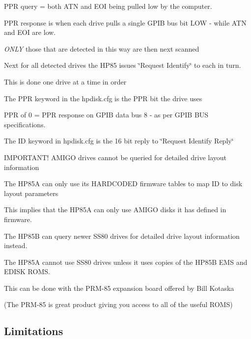 \begin{DoxyItemize}
\begin{DoxyItemize}
\item P\+PR query = both A\+TN and E\+OI being pulled low by the computer.
\item P\+PR response is when each drive pulls a single G\+P\+IB bus bit L\+OW -\/ while A\+TN and E\+OI are low.
\begin{DoxyItemize}
\item {\itshape O\+N\+LY} those that are detected in this way are then next scanned
\end{DoxyItemize}
\item Next for all detected drives the H\+P85 issues \char`\"{}\+Request Identify\char`\"{} to each in turn.
\begin{DoxyItemize}
\item This is done one drive at a time in order
\item The P\+PR keyword in the hpdisk.\+cfg is the P\+PR bit the drive uses
\begin{DoxyItemize}
\item P\+PR of 0 = P\+PR response on G\+P\+IB data bus 8 -\/ as per G\+P\+IB B\+US specifications.
\end{DoxyItemize}
\item The ID keyword in hpdisk.\+cfg is the 16 bit reply to \char`\"{}\+Request Identify Reply\char`\"{}
\begin{DoxyItemize}
\item I\+M\+P\+O\+R\+T\+A\+N\+T! A\+M\+I\+GO drives cannot be queried for detailed drive layout information
\begin{DoxyItemize}
\item The H\+P85A can only use its H\+A\+R\+D\+C\+O\+D\+ED firmware tables to map ID to disk layout parameters
\item This implies that the H\+P85A can only use A\+M\+I\+GO disks it has defined in firmware.
\end{DoxyItemize}
\item The H\+P85B can query newer S\+S80 drives for detailed drive layout information instead.
\item The H\+P85A cannot use S\+S80 drives unless it uses copies of the H\+P85B E\+MS and E\+D\+I\+SK R\+O\+MS.
\begin{DoxyItemize}
\item This can be done with the P\+R\+M-\/85 expansion board offered by Bill Kotaska
\begin{DoxyItemize}
\item (The P\+R\+M-\/85 is great product giving you access to all of the useful R\+O\+MS) 

 \subsection*{Limitations}
\end{DoxyItemize}
\end{DoxyItemize}
\end{DoxyItemize}
\end{DoxyItemize}
\end{DoxyItemize}
\end{DoxyItemize}

